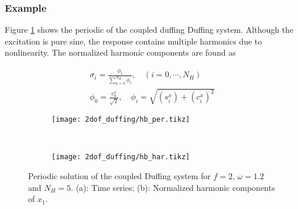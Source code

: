 \subsubsection{Example}
\label{sec:hb_example}

Figure \ref{fig:hb_duffing_periodic} shows the periodic of the coupled duffing
Duffing system. Although the excitation is pure sine, the response contains
multiple harmonics due to nonlinearity. The normalized harmonic components are
found as

\begin{equation}
  \label{eq:hb_normal_coeff}
  \begin{aligned}
    \sigma_i = \frac{\phi_i}{\sum_{k=0}^{N_H} \phi_i}, \quad (i=0,\cdots, N_H) \\
    \phi_0 = \frac{c_0^x}{\sqrt{2}}, \quad \phi_i = \sqrt{(s^x_i) + (c^x_i)^2}
  \end{aligned}
\end{equation}


\begin{figure}[!ht]
  \centering
  \begin{subfigure}[b]{0.6\textwidth}
    \texttt{[image: 2dof\_duffing/hb\_per.tikz]}
    \caption{}
  \end{subfigure}
  ~
  \begin{subfigure}[b]{0.36\textwidth}
    \texttt{[image: 2dof\_duffing/hb\_har.tikz]}
    \caption{}
  \end{subfigure}
    \caption{Periodic solution of the coupled Duffing system for $f=2$,
    $\omega=1.2$ and $N_H=5$.
    (a): Time series; (b): Normalized harmonic components of $x_1$.}
  \label{fig:hb_duffing_periodic}
\end{figure}
\FloatBarrier

